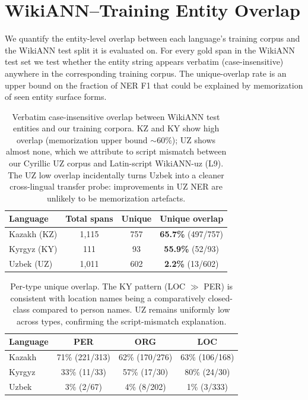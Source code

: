 \documentclass[11pt]{article}
\begin{document}
\section{WikiANN--Training Entity Overlap}
\label{app:overlap}

We quantify the entity-level overlap between each language's training corpus and the WikiANN test split it is evaluated on. For every gold span in the WikiANN test set we test whether the entity string appears verbatim (case-insensitive) anywhere in the corresponding training corpus. The unique-overlap rate is an upper bound on the fraction of NER F1 that could be explained by memorization of seen entity surface forms.

\begin{table}[t]
\centering
\small
\begin{tabular}{lccc}
\toprule
\textbf{Language} & \textbf{Total spans} & \textbf{Unique} & \textbf{Unique overlap} \\
\midrule
Kazakh (KZ)  & 1{,}115 & 757 & \textbf{65.7\%} (497/757) \\
Kyrgyz (KY)  & 111     & 93  & \textbf{55.9\%} (52/93) \\
Uzbek (UZ)   & 1{,}011 & 602 & \textbf{2.2\%}  (13/602) \\
\bottomrule
\end{tabular}
\caption{Verbatim case-insensitive overlap between WikiANN test entities and our training corpora. KZ and KY show high overlap (memorization upper bound $\sim 60\%$); UZ shows almost none, which we attribute to script mismatch between our Cyrillic UZ corpus and Latin-script WikiANN-uz (L9). The UZ low overlap incidentally turns Uzbek into a cleaner cross-lingual transfer probe: improvements in UZ NER are unlikely to be memorization artefacts.}
\label{tab:overlap}
\end{table}

\begin{table}[t]
\centering
\small
\begin{tabular}{lccc}
\toprule
\textbf{Language} & \textbf{PER} & \textbf{ORG} & \textbf{LOC} \\
\midrule
Kazakh & 71\% (221/313) & 62\% (170/276) & 63\% (106/168) \\
Kyrgyz & 33\% (11/33)   & 57\% (17/30)   & 80\% (24/30)   \\
Uzbek  & 3\% (2/67)     & 4\% (8/202)    & 1\% (3/333)    \\
\bottomrule
\end{tabular}
\caption{Per-type unique overlap. The KY pattern (LOC $\gg$ PER) is consistent with location names being a comparatively closed-class compared to person names. UZ remains uniformly low across types, confirming the script-mismatch explanation.}
\label{tab:overlap_per_type}
\end{table}
\end{document}
